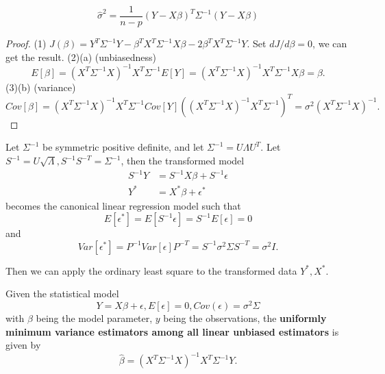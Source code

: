 \begin{refsection}
\begin{theorem}
\begin{itemize}
		$$\hat{\sigma}^2 = \frac{1}{n-p}(Y - X\beta)^T\Sigma^{-1}(Y-X\beta)$$
	\end{itemize}
\end{theorem}
\begin{proof}
	(1) $J(\beta) = Y^T\Sigma^{-1}Y - \beta^TX^T\Sigma^{-1}X\beta - 2\beta^TX^T\Sigma^{-1}Y$. Set $dJ/d\beta = 0$, we can get the result.
	(2)(a) (unbiasedness) $$E[\beta] = (X^T\Sigma^{-1}X)^{-1}X^T\Sigma^{-1} E[Y] = (X^T\Sigma^{-1}X)^{-1}X^T\Sigma^{-1}X\beta = \beta.$$
	(3)(b) (variance) $$Cov[\beta] = (X^T\Sigma^{-1}X)^{-1}X^T\Sigma^{-1}Cov[Y]((X^T\Sigma^{-1}X)^{-1}X^T\Sigma^{-1})^T = \sigma^2(X^T\Sigma^{-1}X)^{-1}.$$
\end{proof}


\begin{note}
	Let $\Sigma^{-1}$ be symmetric positive definite, and let $\Sigma^{-1} = U\Lambda U^T$. Let $S^{-1} = U\sqrt{\Lambda}, S^{-1}S^{-T}=\Sigma^{-1}$, then the transformed model
	\begin{align*}
	S^{-1}Y &= S^{-1}X\beta + S^{-1}\epsilon \\
	Y^* &= X^*\beta + \epsilon^*
	\end{align*}
	becomes the canonical linear regression model such that
	$$E[\epsilon^*] = E[S^{-1}\epsilon] = S^{-1}E[\epsilon] = 0$$
	and
	$$Var[\epsilon^*] = P^{-1}Var[\epsilon]P^{-T} = S^{-1}\sigma^2 \Sigma S^{-T} = \sigma^2 I.$$
	
	Then we can apply the ordinary least square to the transformed data $Y^*,X^*$.
\end{note}



\begin{theorem}\label{ch:regression-analysis:th:GaussMarkovTheoremGLS}
	Given the statistical model
	$$Y= X\beta + \epsilon, E[\epsilon] = 0, Cov(\epsilon) = \sigma^2 \Sigma$$
	with $\beta$ being the model parameter, $y$ being the observations, the \textbf{uniformly minimum variance estimators among all linear unbiased estimators} is given by
	$$\hat{\beta} = (X^T\Sigma^{-1}X)^{-1}X^T\Sigma^{-1}Y.$$
	

\end{theorem}
\end{refsection}
